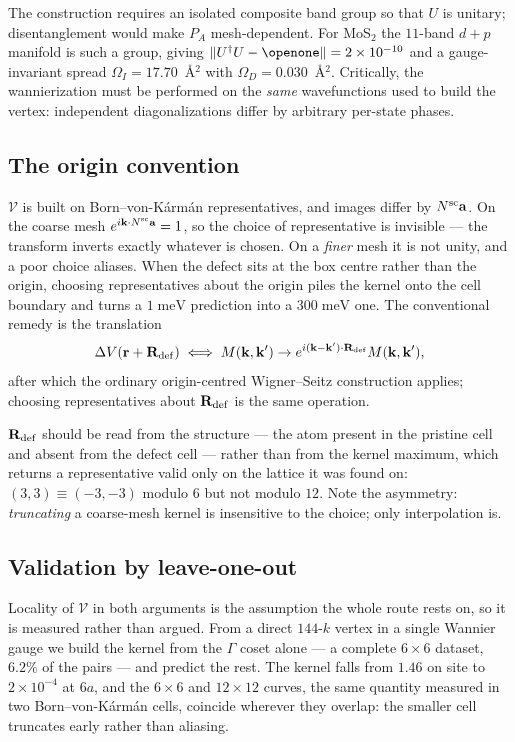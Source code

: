 \documentclass[aps,prx,reprint,superscriptaddress,nofootinbib,longbibliography]{revtex4-2}
\newcommand{\dV}{\Delta V}
\newcommand{\Rd}{\mathbf{R}_{\rm def}}
\newcommand{\kk}{\mathbf{k}}
\newcommand{\rr}{\mathbf{r}}
\newcommand{\meV}{\;\mathrm{meV}}
\begin{document}
The construction requires an isolated composite band group so that $U$ is
unitary; disentanglement would make $P_A$ mesh-dependent. For MoS$_2$ the
$11$-band $d+p$ manifold is such a group, giving $\lVert
U^{\dagger}U-\openone\rVert = 2\times10^{-10}$ and a gauge-invariant spread
$\Omega_I = 17.70$~\AA$^2$ with $\Omega_D = 0.030$~\AA$^2$. Critically, the
wannierization must be performed on the \emph{same} wavefunctions used to build
the vertex: independent diagonalizations differ by arbitrary per-state phases.

\subsection{The origin convention}

$\mathcal{V}$ is built on Born--von-K\'arm\'an representatives, and images
differ by $N^{\rm sc}\mathbf{a}$. On the coarse mesh
$e^{i\kk\cdot N^{\rm sc}\mathbf{a}} = 1$, so the choice of representative is
invisible --- the transform inverts exactly whatever is chosen. On a
\emph{finer} mesh it is not unity, and a poor choice aliases. When the defect
sits at the box centre rather than the origin, choosing representatives about
the origin piles the kernel onto the cell boundary and turns a $1\meV$
prediction into a $300\meV$ one. The conventional remedy is the translation
\begin{equation}
  \dV(\rr + \Rd) \;\Longleftrightarrow\;
  M(\kk,\kk') \to e^{i(\kk-\kk')\cdot\Rd} M(\kk,\kk'),
\end{equation}
after which the ordinary origin-centred Wigner--Seitz construction applies;
choosing representatives about $\Rd$ is the same operation.

$\Rd$ should be read from the structure --- the atom present in the pristine
cell and absent from the defect cell --- rather than from the kernel maximum,
which returns a representative valid only on the lattice it was found on:
$(3,3) \equiv (-3,-3)$ modulo $6$ but not modulo $12$. Note the asymmetry:
\emph{truncating} a coarse-mesh kernel is insensitive to the choice; only
interpolation is.

\subsection{Validation by leave-one-out}

Locality of $\mathcal{V}$ in both arguments is the assumption the whole route
rests on, so it is measured rather than argued. From a direct $144$-$k$ vertex
in a single Wannier gauge we build the kernel from the $\Gamma$ coset alone --- a
complete $6\times6$ dataset, $6.2\%$ of the pairs --- and predict the rest. The
kernel falls from $1.46$ on site to $2\times10^{-4}$ at $6a$, and the $6\times6$
and $12\times12$ curves, the same quantity measured in two Born--von-K\'arm\'an
cells, coincide wherever they overlap: the smaller cell truncates early rather
than aliasing.
\end{document}
